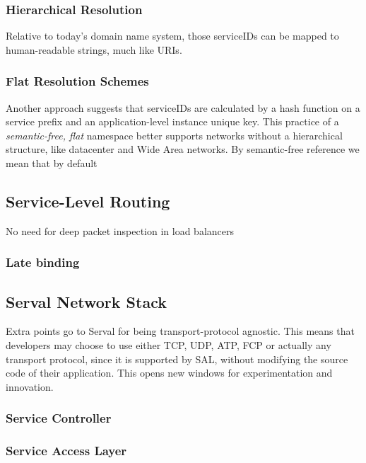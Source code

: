 \subsubsection{Hierarchical Resolution}
Relative to today's domain name system, those serviceIDs can be mapped to human-readable strings, much like URIs.

\subsubsection{Flat Resolution Schemes}
Another approach suggests that serviceIDs are calculated by a hash function on a service prefix and an application-level instance unique key.
This practice of a \emph{semantic-free, flat} namespace better supports networks without a hierarchical structure, like datacenter and Wide Area networks.
By semantic-free\cite{Walfisha2004} reference we mean that by default 

\subsection{Service-Level Routing} 
No need for deep packet inspection in load balancers


\subsubsection{Late binding}

\subsection{Serval Network Stack}
Extra points go to Serval for being transport-protocol agnostic.
This means that developers may choose to use either TCP, UDP, ATP, FCP or actually any transport protocol, since it is supported by SAL, without modifying the source code of their application.
This opens new windows for experimentation and innovation.

\subsubsection{Service Controller}

\subsubsection{Service Access Layer}

